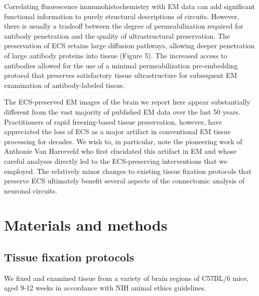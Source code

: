 \documentclass{article}
\begin{document}
Correlating fluorescence immunohistochemistry with EM data can add significant functional information to purely structural descriptions of circuits. However, there is usually a tradeoff between the degree of permeabilization required for antibody penetration and the quality of ultrastructural preservation. The preservation of ECS retains large diffusion pathways, allowing deeper penetration of large antibody proteins into tissue (Figure 5). The increased access to antibodies allowed for the use of a minimal permeabilization pre-embedding protocol that preserves satisfactory tissue ultrastructure for subsequent EM examination of antibody-labeled tissue.

The ECS-preserved EM images of the brain we report here appear substantially different from the vast majority of published EM data over the last 50 years. Practitioners of rapid freezing-based tissue preservation, however, have appreciated the loss of ECS as a major artifact in conventional EM tissue processing for decades. We wish to, in particular, note the pioneering work of Anthonie Van Harreveld who first elucidated this artifact in EM and whose careful analyses directly led to the ECS-preserving interventions that we employed. The relatively minor changes to existing tissue fixation protocols that preserve ECS ultimately benefit several aspects of the connectomic analysis of neuronal circuits.

\section*{Materials and methods}

\subsection*{Tissue fixation protocols}

We fixed and examined tissue from a variety of brain regions of C57BL/6 mice, aged 9-12 weeks in accordance with NIH animal ethics guidelines.
\end{document}

